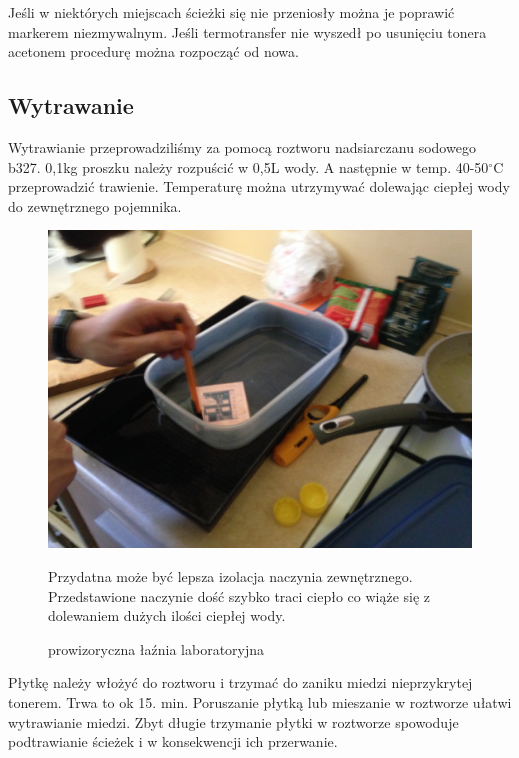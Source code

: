 \documentclass[a4paper,11pt]{article}
\def\SCALE{0.6}
\begin{document}
Jeśli w niektórych miejscach ścieżki się nie przeniosły można je poprawić markerem niezmywalnym.
Jeśli termotransfer nie wyszedł po usunięciu tonera acetonem procedurę można rozpocząć od nowa.
\subsection{Wytrawanie}

Wytrawianie przeprowadziliśmy za pomocą roztworu nadsiarczanu sodowego b327. 0,1kg proszku należy rozpuścić w 0,5L wody. A następnie w temp. 40-50$^\circ$C przeprowadzić trawienie. Temperaturę można utrzymywać dolewając ciepłej wody do zewnętrznego pojemnika.

\begin{figure}[H]
	\centering
	\includegraphics[width=\SCALE
	\paperwidth]{wanienka}
	\caption{prowizoryczna łaźnia laboratoryjna}
	Przydatna może być lepsza izolacja naczynia zewnętrznego. Przedstawione naczynie dość szybko traci ciepło co wiąże się z dolewaniem dużych ilości ciepłej wody.
\end{figure}


Płytkę należy włożyć do roztworu i trzymać do zaniku miedzi nieprzykrytej tonerem. Trwa to ok 15. min. Poruszanie płytką lub mieszanie w roztworze ułatwi wytrawianie miedzi. Zbyt długie trzymanie płytki w roztworze spowoduje podtrawianie ścieżek i w konsekwencji ich przerwanie.
\end{document}
